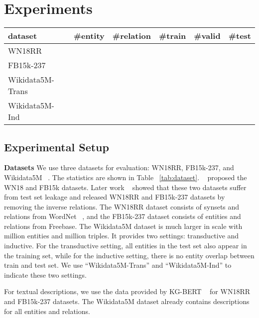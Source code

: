 \documentclass[11pt]{article}
\begin{document}
\section{Experiments}

\begin{table*}[ht]
\centering
\begin{tabular}{@{}l|lllll@{}}
\toprule
dataset          & \#entity & \#relation & \#train & \#valid & \#test \\ \midrule
WN18RR           &     &        &     &      &       \\
FB15k-237        &     &      &    &   &  \\
Wikidata5M-Trans &      &     &      &    &      \\
Wikidata5M-Ind   &      &    &    &   &    \\ \bottomrule
\end{tabular}
\caption{Statistics of the datasets used in this paper.
``Wikidata5M-Trans'' and ``Wikidata5M-Ind'' refer to the transductive and inductive settings,
respectively.}
\label{tab:dataset}
\end{table*}

\subsection{Experimental Setup}

\noindent
\textbf{Datasets }
We use three datasets for evaluation:
WN18RR,
FB15k-237,
and Wikidata5M ~\citep{wang2021kepler}.
The statistics are shown in Table ~\ref{tab:dataset}.
~\citet{bordes2013translating} proposed the WN18 and FB15k datasets.
Later work ~\citep{toutanova-etal-2015-representing,dettmers2018convolutional}
showed that these two datasets suffer from test set leakage
and released WN18RR and FB15k-237 datasets by removing the inverse relations.
The WN18RR dataset consists of  synsets and  relations from WordNet ~\citep{miller1995wordnet},
and the FB15k-237 dataset consists of  entities and  relations from Freebase.
The Wikidata5M dataset is much larger in scale with  million entities and  million triples.
It provides two settings: transductive and inductive.
For the transductive setting,
all entities in the test set also appear in the training set,
while for the inductive setting,
there is no entity overlap between train and test set.
We use ``Wikidata5M-Trans'' and ``Wikidata5M-Ind'' to indicate these two settings.

For textual descriptions,
we use the data provided by KG-BERT ~\citep{yao2019kg} for WN18RR and FB15k-237 datasets.
The Wikidata5M dataset already contains descriptions for all entities and relations.
\newline
\end{document}
